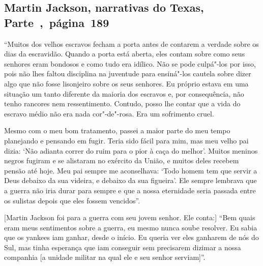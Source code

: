 \subsection{Martin Jackson, narrativas do Texas, Parte~,~página~189}
\label{ref161}

``Muitos dos velhos escravos fecham a porta antes de contarem a verdade
sobre os dias da escravidão. Quando a porta está aberta, eles contam
sobre como seus senhores eram bondosos e como tudo era idílico. Não se
pode culpá"-los por isso, pois não lhes faltou disciplina na juventude
para ensiná"-los cautela sobre dizer algo que não fosse lisonjeiro sobre
os seus senhores. Eu próprio estava em uma situação um tanto diferente
da maioria dos escravos e, por consequência, não tenho rancores nem
ressentimento. Contudo, posso lhe contar que a vida do escravo médio não
era nada cor"-de"-rosa. Era um sofrimento cruel.

Mesmo com o meu bom tratamento, passei a maior parte do meu tempo
planejando e pensando em fugir. Teria sido fácil para mim, mas meu velho
pai dizia: `Não adianta correr do ruim para o pior à caça do melhor'.
Muitos meninos negros fugiram e se alistaram no exército da União, e
muitos deles recebem pensão até hoje. Meu pai sempre me aconselhava:
`Todo homem tem que servir a Deus debaixo da sua videira, e debaixo da
sua figueira'. Ele sempre lembrava que a guerra não iria durar para
sempre e que a nossa eternidade seria passada entre os sulistas depois
que eles fossem vencidos''.

{[}Martin Jackson foi para a guerra com seu jovem senhor. Ele conta:{]}
``Bem quais eram meus sentimentos sobre a guerra, eu mesmo nunca soube
resolver. Eu sabia que os yankees iam ganhar, desde o início. Eu queria
ver eles ganharem de nós do Sul, mas tinha esperança que iam conseguir
sem precisarem dizimar a nossa companhia {[}a unidade militar na qual
ele e seu senhor serviam{]}''.

